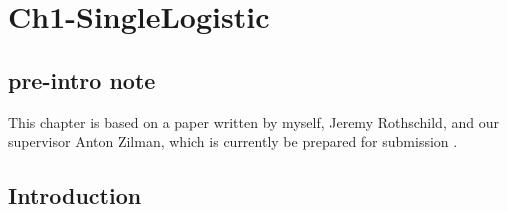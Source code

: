 \chapter{Ch1-SingleLogistic}





\section*{pre-intro note}
This chapter is based on a paper written by myself, Jeremy Rothschild, and our supervisor Anton Zilman, which is currently be prepared for submission \cite{Badali2018a}. 

\section{Introduction} \label{Introduction}%


